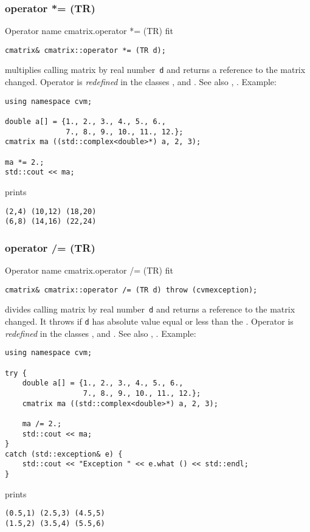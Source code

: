 \subsubsection{operator *= (TR)}
Operator%
\pdfdest name {cmatrix.operator *= (TR)} fit
\begin{verbatim}
cmatrix& cmatrix::operator *= (TR d);
\end{verbatim}
multiplies  calling matrix by  real number~\verb"d"
and returns a reference to
the matrix changed.
Operator is \emph{redefined} in the classes
,  
and .
See also ,
.
Example:
\begin{Verbatim}
using namespace cvm;

double a[] = {1., 2., 3., 4., 5., 6.,
              7., 8., 9., 10., 11., 12.};
cmatrix ma ((std::complex<double>*) a, 2, 3);

ma *= 2.;
std::cout << ma;
\end{Verbatim}
prints
\begin{Verbatim}
(2,4) (10,12) (18,20)
(6,8) (14,16) (22,24)
\end{Verbatim}
\newpage



\subsubsection{operator /= (TR)}
Operator%
\pdfdest name {cmatrix.operator /= (TR)} fit
\begin{verbatim}
cmatrix& cmatrix::operator /= (TR d) throw (cvmexception);
\end{verbatim}
divides  calling matrix by  real number~\verb"d"
and returns a reference to
the matrix changed.
It throws  
if \verb"d" has  absolute value equal or less
than the 
.
Operator is \emph{redefined} in the classes
,  
and .
See also ,
.
Example:
\begin{Verbatim}
using namespace cvm;

try {
    double a[] = {1., 2., 3., 4., 5., 6.,
                  7., 8., 9., 10., 11., 12.};
    cmatrix ma ((std::complex<double>*) a, 2, 3);

    ma /= 2.;
    std::cout << ma;
}
catch (std::exception& e) {
    std::cout << "Exception " << e.what () << std::endl;
}
\end{Verbatim}
prints
\begin{Verbatim}
(0.5,1) (2.5,3) (4.5,5)
(1.5,2) (3.5,4) (5.5,6)
\end{Verbatim}
\newpage




